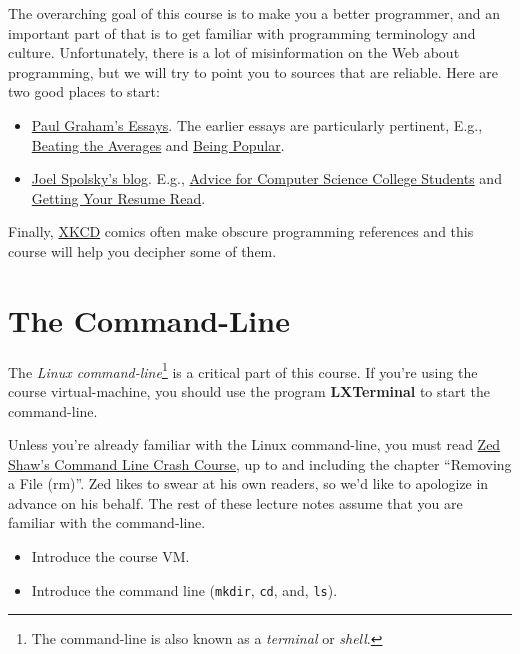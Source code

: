 \documentclass{book}
\begin{document}
The overarching goal of this course is to make you a better programmer,
and an important part of that is to get familiar with programming terminology
and culture. Unfortunately, there is a lot of misinformation on the Web
about programming, but we will try to point you to sources that are reliable.
Here are two good places to start:
%
\begin{itemize}

  \item \href{http://paulgraham.com/articles.html}{Paul Graham's Essays}.
  The earlier essays are particularly pertinent, E.g.,
  \href{http://paulgraham.com/avg.html}{Beating the Averages} and
  \href{http://paulgraham.com/popular.html}{Being Popular}.

  \item \href{http://www.joelonsoftware.com}{Joel Spolsky's blog}. E.g.,
  \href{http://www.joelonsoftware.com/articles/CollegeAdvice.html}
  {Advice for Computer Science College Students}
  and \href{http://www.joelonsoftware.com/articles/ResumeRead.html}
  {Getting Your Resume Read}.

\end{itemize}

Finally, \href{http://xkcd.com}{XKCD} comics often make obscure programming
references and this course will help you decipher some of them.

\section{The Command-Line}

The \emph{Linux command-line}\footnote{The command-line is also known as a
\emph{terminal} or \emph{shell}.} is  a critical part of this course. If you're
using the course virtual-machine, you should use the program \textbf{LXTerminal}
to start the command-line.

Unless you're already familiar with the Linux command-line, you must read
\href{http://learncodethehardway.org/cli/book/cli-crash-course.html}{Zed Shaw's Command Line Crash Course},
up to and including the chapter ``Removing a File (rm)''. Zed likes to swear at
his own readers, so we'd like to apologize in advance on his behalf. The rest
of these lecture notes assume that you are familiar with the command-line.

\begin{instructor}
\begin{itemize}

\item Introduce the course VM.

\item  Introduce the command line (\verb|mkdir|, \verb|cd|, and, \verb|ls|).
\end{itemize}

\end{instructor}
\end{document}
